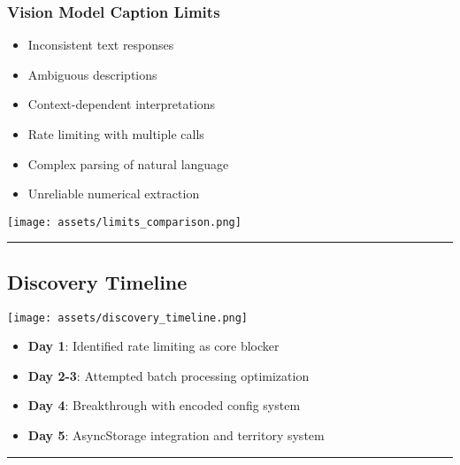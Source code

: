 \documentclass[
  letterpaper,
  DIV=11,
  numbers=noendperiod]{scrartcl}
\providecommand{\tightlist}{%
  \setlength{\itemsep}{0pt}\setlength{\parskip}{0pt}}
\begin{document}
\subsubsection{Vision Model Caption
Limits}\label{vision-model-caption-limits}

\begin{itemize}
\tightlist
\item
  Inconsistent text responses
\item
  Ambiguous descriptions\\
\item
  Context-dependent interpretations
\item
  Rate limiting with multiple calls
\item
  Complex parsing of natural language
\item
  Unreliable numerical extraction
\end{itemize}

\begin{center}
\texttt{[image: assets/limits\_comparison.png]}
\end{center}

\begin{center}\rule{0.5\linewidth}{0.5pt}\end{center}

\subsection{Discovery Timeline}\label{discovery-timeline}

\begin{center}
\texttt{[image: assets/discovery\_timeline.png]}
\end{center}

\begin{itemize}
\tightlist
\item
  \textbf{Day 1}: Identified rate limiting as core blocker
\item
  \textbf{Day 2-3}: Attempted batch processing optimization\\
\item
  \textbf{Day 4}: Breakthrough with encoded config system
\item
  \textbf{Day 5}: AsyncStorage integration and territory system
\end{itemize}

\begin{center}\rule{0.5\linewidth}{0.5pt}\end{center}
\end{document}
